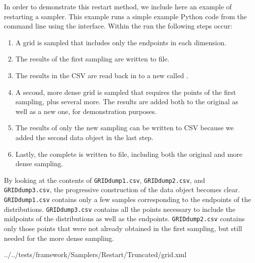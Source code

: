 In order to demonstrate this restart method, we include here an example of restarting a 
sampler.  This example runs a simple example Python code from the command line using the 
interface.  Within the run the following steps occur:
\begin{enumerate}
  \item A grid is sampled that includes only the endpoints in each dimension.
  \item The results of the first sampling are written to file.
  \item The results in the CSV are read back in to a new  called .
  \item A second, more dense grid is sampled that requires the points of the first sampling, plus several
    more.  The results are added both to the original  as well as a new one, for
    demonstration purposes.
  \item The results of only the new sampling can be written to CSV because we added the second data object in
    the last step.
  \item Lastly, the complete  is written to file, including both the original and more
    dense sampling.
\end{enumerate}
By looking at the contents of \texttt{GRIDdump1.csv}, \texttt{GRIDdump2.csv}, and \texttt{GRIDdump3.csv}, the
progressive construction of the data object becomes clear.  \texttt{GRIDdump1.csv} contains only a few samples
corresponding to the endpoints of the distributions.  \texttt{GRIDdump3.csv} contains all the points necessary
to include the midpoints of the distributions as well as the endpoints.  \texttt{GRIDdump2.csv} contains only
those points that were not already obtained in the first sampling, but still needed for the more dense
sampling.


\footnotesize

  {../../tests/framework/Samplers/Restart/Truncated/grid.xml}
\normalsize

